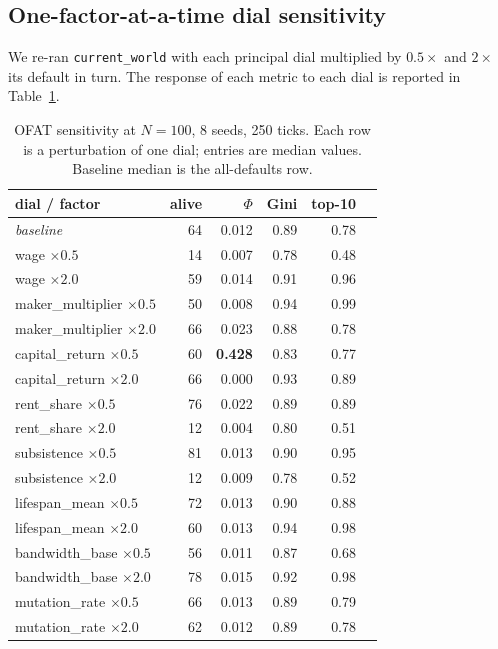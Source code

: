 \documentclass[11pt]{article}
\begin{document}
\subsection{One-factor-at-a-time dial sensitivity}

We re-ran \texttt{current\_world} with each principal dial
multiplied by $0.5\times$ and $2\times$ its default in turn.  The
response of each metric to each dial is reported in
Table~\ref{tab:sensitivity}.

\begin{table}[h]
\centering
\small
\caption{OFAT sensitivity at $N=100$, 8 seeds, 250 ticks.  Each
row is a perturbation of one dial; entries are median values.
Baseline median is the all-defaults row.}
\label{tab:sensitivity}
\begin{tabular}{lrrrrr}
\toprule
dial / factor & alive & $\Phi$ & Gini & top-10 \\
\midrule
\emph{baseline}      & 64 & 0.012 & 0.89 & 0.78 \\
wage              $\times 0.5$        & 14 & 0.007 & 0.78 & 0.48 \\
wage              $\times 2.0$        & 59 & 0.014 & 0.91 & 0.96 \\
maker\_multiplier $\times 0.5$        & 50 & 0.008 & 0.94 & 0.99 \\
maker\_multiplier $\times 2.0$        & 66 & 0.023 & 0.88 & 0.78 \\
capital\_return   $\times 0.5$        & 60 & \textbf{0.428} & 0.83 & 0.77 \\
capital\_return   $\times 2.0$        & 66 & 0.000 & 0.93 & 0.89 \\
rent\_share       $\times 0.5$        & 76 & 0.022 & 0.89 & 0.89 \\
rent\_share       $\times 2.0$        & 12 & 0.004 & 0.80 & 0.51 \\
subsistence       $\times 0.5$        & 81 & 0.013 & 0.90 & 0.95 \\
subsistence       $\times 2.0$        & 12 & 0.009 & 0.78 & 0.52 \\
lifespan\_mean    $\times 0.5$        & 72 & 0.013 & 0.90 & 0.88 \\
lifespan\_mean    $\times 2.0$        & 60 & 0.013 & 0.94 & 0.98 \\
bandwidth\_base   $\times 0.5$        & 56 & 0.011 & 0.87 & 0.68 \\
bandwidth\_base   $\times 2.0$        & 78 & 0.015 & 0.92 & 0.98 \\
mutation\_rate    $\times 0.5$        & 66 & 0.013 & 0.89 & 0.79 \\
mutation\_rate    $\times 2.0$        & 62 & 0.012 & 0.89 & 0.78 \\
\bottomrule
\end{tabular}
\end{table}
\end{document}
